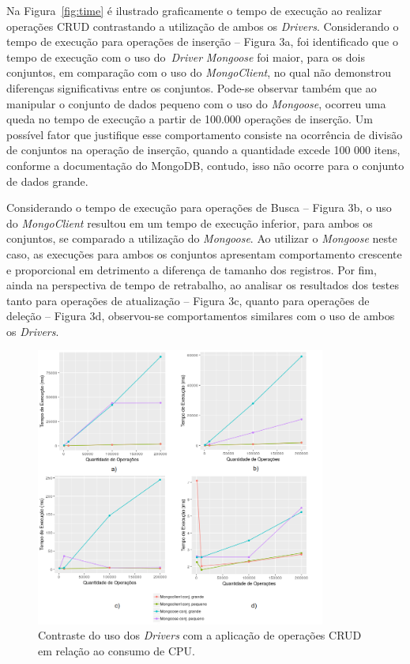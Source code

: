 \documentclass[12pt]{article}
\begin{document}
Na Figura~\ref{fig:time} é ilustrado graficamente o tempo de execução ao realizar operações CRUD contrastando a utilização de ambos os \emph{Drivers}. Considerando o tempo de execução para operações de inserção -- Figura 3a, foi identificado que o tempo de execução com o uso do~\emph{Driver} \emph{Mongoose} foi maior, para os dois conjuntos, em comparação com o uso do \emph{MongoClient}, no qual não demonstrou diferenças significativas entre os conjuntos. Pode-se observar também que ao manipular o conjunto de dados pequeno com o uso do \emph{Mongoose}, ocorreu uma queda no tempo de execução a partir de 100.000 operações de inserção. Um possível fator que justifique esse comportamento consiste na ocorrência de divisão de conjuntos na operação de inserção, quando a quantidade excede 100 000 itens, conforme a documentação do MongoDB, contudo, isso não ocorre para o conjunto de dados grande.

Considerando o tempo de execução para operações de Busca -- Figura 3b, o uso do \emph{MongoClient} resultou em um tempo de execução inferior, para ambos os conjuntos, se comparado a utilização do \emph{Mongoose}. Ao utilizar o \emph{Mongoose} neste caso, as execuções para ambos os conjuntos apresentam comportamento crescente e proporcional em detrimento a diferença de tamanho dos registros. Por fim, ainda na perspectiva de tempo de retrabalho, ao analisar os resultados dos testes tanto para operações de atualização -- Figura 3c, quanto para operações de deleção -- Figura 3d, observou-se comportamentos similares com o uso de ambos os \emph{Drivers}.

\begin{figure}[!ht]
    \centering
    \includegraphics[width=0.85\textwidth]{images/cpuusage}
	 \caption{Contraste do uso dos \emph{Drivers} com a aplicação de operações CRUD em relação ao consumo de CPU.}
    \label{fig:cpuusage}
\end{figure}
\end{document}
